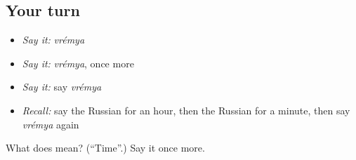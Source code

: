 \subsection*{Your turn}
\begin{itemize}
\raggedright
  \item \emph{Say it:} \emph{vrémya}
  \item \emph{Say it:} \emph{vrémya}, once more
  \item \emph{Say it:} say \emph{vrémya}
  \item \emph{Recall:} say the Russian for an hour, then the Russian for a minute, then say \emph{vrémya} again
\end{itemize}

\begin{tcolorbox}[breakable,colback=teal!4,colframe=teal!35!black,title={Before you move on}]
What does  mean? (\textquotedblleft{}Time\textquotedblright{}.) Say it once more.
\end{tcolorbox}
